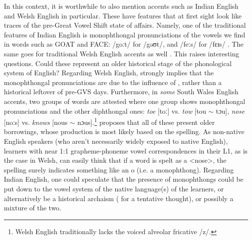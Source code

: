 In this context, it is worthwhile to also mention accents such as Indian English and Welsh English in particular. These have features that at first sight look like traces of the pre-Great Vowel Shift state of affairs. Namely, one of the traditional features of Indian English is monophthongal pronunciations of the vowels we find in words such as GOAT and FACE: /goːt/ for /gəʊt/, and /feːs/ for /fɛɪs/ \citep[626]{Wells1982c}. The same goes for traditional Welsh English accents as well \citep[382--385]{Wells1982b}. This raises interesting questions. Could these represent an older historical stage of the phonological system of English? Regarding Welsh English, \citet[382--383]{Wells1982b} strongly implies that the monophthongal pronunciations are due to the influence of , rather than a historical leftover of pre-GVS days. Furthermore, in \textit{some} South Wales English accents, two groups of words are attested where one group shows monophthongal pronunciations and the other diphthongal ones: \textit{toe} [toː] vs. \textit{tow} [tou $\sim$ tɔu], \textit{nose} [noːs] vs. \textit{knows} [nous $\sim$ nɔus].\footnote{Welsh English traditionally lacks the voiced alveolar fricative /z/.} \citet[384--385]{Wells1982b} proposes that all of these present older borrowings, whose production is most likely based on the spelling. As non-native English speakers (who aren't necessarily widely exposed to native English), learners with near 1:1 grapheme-phoneme vowel correspondences in their L1, as is the case in Welsh, can easily think that if a word is spelt as a <nose>, the spelling surely indicates something like an o (i.e. a monophthong). Regarding Indian English, one could speculate that the presence of monophthongs could be put down to the vowel system of the native language(s) of the learners, or alternatively be a historical archaism (\citealp[626]{Wells1982c} for a tentative thought), or possibly a mixture of the two.

